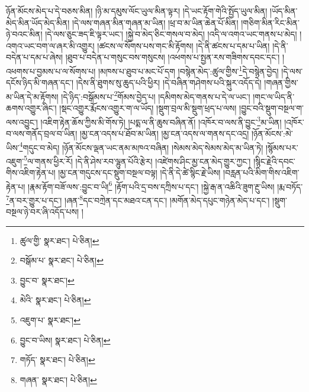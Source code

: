 ཉོན་མོངས་མེད་པ་དེ་བཅས་མིན། །ཉི་མ་དམུས་ལོང་ཡུལ་མིན་ལྟར། །དེ་ཡང་རྟོག་གེའི་སྤྱོད་ཡུལ་མིན། །ཡོད་མིན་མེད་མིན་ཡོད་མེད་མིན། །དེ་ལས་གཞན་མིན་གཞན་མ་ཡིན། །ཕྲ་བ་མ་ཡིན་ཆེན་པོ་མིན། །གཅིག་མིན་རིང་མིན་ཉེ་བའང་མིན། །དེ་ལས་ཅུང་ཟད་ཇི་ལྟར་ཡང་། །སྐྱེ་བ་མེད་ཅིང་གསལ་བ་མེད། །འདི་ལ་འགའ་ཡང་གནས་པ་མེད། །འགའ་ཡང་བག་ལ་ཞར་མི་འགྱུར། །ཚངས་ལ་སོགས་པས་གང་མི་རྟོགས། །དེ་ནི་ཚངས་པ་དམ་པ་ཡིན། །དེ་ནི་བདེན་པ་དམ་པ་ཞེས། །ཐུབ་པ་བདེན་པ་གསུང་བས་གསུངས། །འཕགས་པ་སྤྱན་རས་གཟིགས་དབང་དང་། །འཕགས་པ་བྱམས་པ་ལ་སོགས་པ། །མཁས་པ་ཐུབ་པ་མང་པོ་དག །བསྙེན་མེད་:ཚུལ་གྱིས་\footnote{ཚུལ་གྱི་  སྣར་ཐང་།  པེ་ཅིན། }དེ་བསྙེན་བྱེད། །དེ་ལས་དངོས་ཉིད་མི་གཞན་དང་། །དེས་ནི་ཐུགས་སུ་ཆུད་པའི་ཕྱིར། །དེ་བཞིན་གཤེགས་པའི་སྐུར་འདོད་དེ། །གཞན་གྱིས་མ་ཡིན་དེ་མ་རྟོགས། །དེ་ཉིད་:བསྒོམས་པ་\footnote{བསྒོམ་པ་  སྣར་ཐང་།  པེ་ཅིན། }གོམས་བྱེད་པ། །དམིགས་མེད་གནས་པ་དེ་ལ་ཡང་། །གང་ལ་ཡིད་ནི་ཆགས་འགྱུར་ཞིང་། །སྡང་འགྱུར་རྨོངས་འགྱུར་ག་ལ་ཡོད། །སྡུག་བྲལ་མི་སྡུག་ཕྲད་པ་ལས། །བྱུང་བའི་སྡུག་བསྔལ་ག་ལས་འབྱུང་། །འཇིག་རྟེན་ཆོས་ཀྱིས་མི་གོས་ཏེ། །པདྨ་ལ་ནི་ཆུས་བཞིན་ནོ། །འཁོར་བ་ལས་ནི་བྱུང་\footnote{བྱུང་བ་  སྣར་ཐང་། }མ་ཡིན། །འཁོར་བ་ལས་གནོད་བྲལ་བ་ཡིན། །མྱ་ངན་འདས་པ་ཐོབ་མ་ཡིན། །མྱ་ངན་འདས་ལ་གནས་དང་འདྲ། །ཉོན་མོངས་:མེ་ཡིས་\footnote{མེའི་  སྣར་ཐང་།  པེ་ཅིན། }གདུང་བ་མེད། །ཉོན་མོངས་ལྡན་ཡང་ནམ་མཁའ་བཞིན། །སེམས་མེད་སེམས་མེད་མ་ཡིན་ཏེ། །སྙོམས་པར་འཇུག་\footnote{འཇུག་པ་  སྣར་ཐང་། }ལ་གནས་ཕྱིར་རོ། །དེ་ནི་ཤེས་རབ་ལྷུན་པོའི་རྩེར། །འཛེགས་ཤིང་མྱ་ངན་མེད་གྱུར་ཀྱང་། །སྙིང་རྗེའི་དབང་གིས་འཇིག་རྟེན་པ། །མྱ་ངན་གདུངས་དང་སྡུག་བསྔལ་བལྟ། །དེ་ནི་དེ་ཚེ་སྙིང་རྗེ་ཡིས། །བརླན་པའི་མིག་གིས་འཇིག་རྟེན་པ། །རྣམ་རྟོག་བཟོ་ལས་:བྱུང་བ་ཡི།\footnote{བྱུང་བ་ཡིས།  སྣར་ཐང་།  པེ་ཅིན། } །རྟོག་པའི་དྲ་བས་དཀྲིས་པ་དང་། །སྐྱེ་རྒ་ན་འཆིའི་ཟུག་རྔུ་ཡིས། །རྨ་བཏོད་\footnote{གཏོད་  སྣར་ཐང་།  པེ་ཅིན། }ན་བར་གྱུར་པ་དང་། །ཞན་\footnote{གཞན་  སྣར་ཐང་།  པེ་ཅིན། }དང་བཀྲེན་དང་མཐའ་ངན་དང་། །མགོན་མེད་དཔུང་གཉེན་མེད་པ་དང་། །སྡུག་བསྔལ་ཉེ་བར་ཞི་འདོད་པས། །
